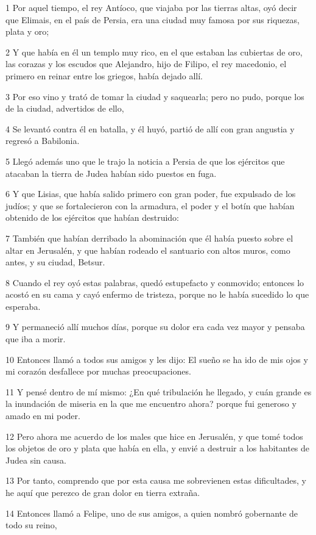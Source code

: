 \par 1 Por aquel tiempo, el rey Antíoco, que viajaba por las tierras altas, oyó decir que Elimais, en el país de Persia, era una ciudad muy famosa por sus riquezas, plata y oro;
\par 2 Y que había en él un templo muy rico, en el que estaban las cubiertas de oro, las corazas y los escudos que Alejandro, hijo de Filipo, el rey macedonio, el primero en reinar entre los griegos, había dejado allí.
\par 3 Por eso vino y trató de tomar la ciudad y saquearla; pero no pudo, porque los de la ciudad, advertidos de ello,
\par 4 Se levantó contra él en batalla, y él huyó, partió de allí con gran angustia y regresó a Babilonia.
\par 5 Llegó además uno que le trajo la noticia a Persia de que los ejércitos que atacaban la tierra de Judea habían sido puestos en fuga.
\par 6 Y que Lisias, que había salido primero con gran poder, fue expulsado de los judíos; y que se fortalecieron con la armadura, el poder y el botín que habían obtenido de los ejércitos que habían destruido:
\par 7 También que habían derribado la abominación que él había puesto sobre el altar en Jerusalén, y que habían rodeado el santuario con altos muros, como antes, y su ciudad, Betsur.
\par 8 Cuando el rey oyó estas palabras, quedó estupefacto y conmovido; entonces lo acostó en su cama y cayó enfermo de tristeza, porque no le había sucedido lo que esperaba.
\par 9 Y permaneció allí muchos días, porque su dolor era cada vez mayor y pensaba que iba a morir.
\par 10 Entonces llamó a todos sus amigos y les dijo: El sueño se ha ido de mis ojos y mi corazón desfallece por muchas preocupaciones.
\par 11 Y pensé dentro de mí mismo: ¿En qué tribulación he llegado, y cuán grande es la inundación de miseria en la que me encuentro ahora? porque fui generoso y amado en mi poder.
\par 12 Pero ahora me acuerdo de los males que hice en Jerusalén, y que tomé todos los objetos de oro y plata que había en ella, y envié a destruir a los habitantes de Judea sin causa.
\par 13 Por tanto, comprendo que por esta causa me sobrevienen estas dificultades, y he aquí que perezco de gran dolor en tierra extraña.
\par 14 Entonces llamó a Felipe, uno de sus amigos, a quien nombró gobernante de todo su reino,

